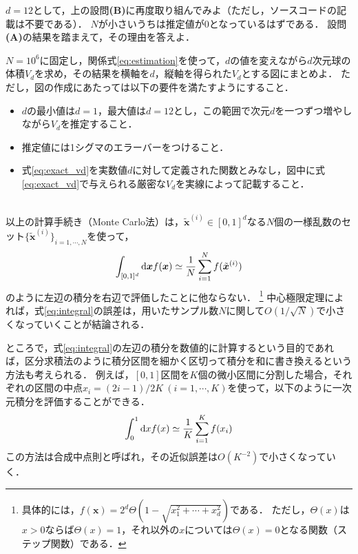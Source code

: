 \documentclass[a4paper,12pt]{jsarticle}
\begin{document}
$d=12$として，上の設問{\bf (B)}に再度取り組んでみよ（ただし，ソースコードの記載は不要である）．
$N$が小さいうちは推定値が$0$となっているはずである．
設問{\bf (A)}の結果を踏まえて，その理由を答えよ．\\

\clearpage

$N=10^{6}$に固定し，関係式\eqref{eq:estimation}を使って，$d$の値を変えながら$d$次元球の体積$V_{d}$を求め，その結果を横軸を$d$，縦軸を得られた$V_{d}$とする図にまとめよ．
ただし，図の作成にあたっては以下の要件を満たすようにすること．
\begin{itemize}
    \item $d$の最小値は$d=1$，最大値は$d=12$とし，この範囲で次元$d$を一つずつ増やしながら$V_{d}$を推定すること．
    \item 推定値には1シグマのエラーバーをつけること．
    \item 式\eqref{eq:exact_vd}を実数値$d$に対して定義された関数とみなし，図中に式\eqref{eq:exact_vd}で与えられる厳密な$V_{d}$を実線によって記載すること．
\end{itemize}
~\\


以上の計算手続き（Monte Carlo法）は，$\tilde{\bm{x}}^{(i)}\in[0,1]^{d}$なる$N$個の一様乱数のセット$\{\tilde{\bm{x}}^{(i)}\}_{i=1,\cdots,N}$を使って，
\begin{align}
\label{eq:integral}
    \int_{[0,1]^{d}}{\rm d}\bm{x}f(\bm{x})
    \simeq\frac{1}{N}\sum_{i=1}^{N}f(\tilde{\bm{x}}^{(i)})
\end{align}
のように左辺の積分を右辺で評価したことに他ならない．
\footnote{
具体的には，$f(\bm{x})=2^{d}\Theta\left(1-\sqrt{x_{1}^{2}+\cdots+x_{d}^{2}}\right)$である．
ただし，$\Theta(x)$は$x>0$ならば$\Theta(x)=1$，それ以外の$x$については$\Theta(x)=0$となる関数（ステップ関数）である．
}
中心極限定理によれば，式\eqref{eq:integral}の誤差は，用いたサンプル数$N$に関して$O(1/\sqrt{N})$で小さくなっていくことが結論される．

ところで，式\eqref{eq:integral}の左辺の積分を数値的に計算するという目的であれば，区分求積法のように積分区間を細かく区切って積分を和に書き換えるという方法も考えられる．
例えば，$[0,1]$区間を$K$個の微小区間に分割した場合，それぞれの区間の中点$x_{i}=(2i-1)/2K~(i=1,\cdots,K)$を使って，以下のように一次元積分を評価することができる．
\begin{align}
\label{eq:discretize}
    \int^{1}_{0}{\rm d}xf(x)
    \simeq
    \frac{1}{K}\sum_{i=1}^{K}f(x_{i})
\end{align}
この方法は合成中点則と呼ばれ，その近似誤差は$O(K^{-2})$で小さくなっていく．
\end{document}
